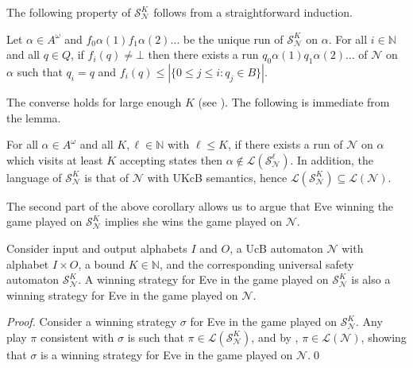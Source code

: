\documentclass[runningheads,a4paper,draft]{llncs}
\newcommand{\eve}{Eve\xspace}
\newcommand{\calN}{\mathcal{N}}
\newcommand{\calS}{\mathcal{S}}
\newcommand{\lang}[1]{\mathcal{L}({#1})}
\begin{document}
The following property of $\calS^K_\calN$ follows from a straightforward
induction.
\begin{lemma}\label{lem:runs-visits}
  Let $\alpha \in A^\omega$ and $f_0 \alpha(1) f_1 \alpha(2) \dots$ be the
  unique run of $\calS^K_\calN$ on $\alpha$. For all $i \in \mathbb{N}$ and
  all $q \in Q$, if $f_i(q) \neq \bot$ then there exists a run $q_0
  \alpha(1) q_1 \alpha(2) \dots$ of $\calN$ on $\alpha$ such that $q_i = q$
  and $f_i(q) \leq |\{0 \leq j \leq i : q_j \in B\}|$.
\end{lemma}
%
The converse holds for large enough $K$ (see ).
The following is immediate from the lemma.
%
\begin{corollary}\label{cor:safe-approx}
  For all $\alpha \in A^\omega$ and all $K,\ell \in \mathbb{N}$ with $\ell
  \leq K$, if there exists a run of $\calN$ on $\alpha$ which visits 
  at least $K$ accepting states then $\alpha \not\in \lang{\calS^\ell_\calN}$.
  In addition, the
  language of \(\calS^K_\calN\) is that of \(\calN\) with UKcB semantics,
  hence \(\lang{\calS^K_\calN} \subseteq \lang{\calN}\).
\end{corollary}

The second part of the above corollary allows us to argue that \eve winning
the game played on $\calS^K_\calN$ implies she wins the game played on
$\calN$.
\begin{lemma}
    Consider input and output alphabets $I$ and $O$, a UcB
    automaton $\calN$ with alphabet $I \times O$, a bound $K \in \mathbb{N}$,
    and the corresponding universal safety automaton $\calS^K_\calN$. A
    winning strategy for \eve in the game played on $\calS^K_\calN$
    is also a winning strategy for \eve in the game played on
    $\calN$.
\end{lemma}
\begin{proof}
  Consider a winning strategy \(\sigma\) for \eve in the game played on
  \(\calS^K_\calN\).  Any play \(\pi\) consistent with \(\sigma\) is such that
  \(\pi \in \lang{\calS^K_\calN}\), and by ,
  \(\pi \in \lang{\calN}\), showing that \(\sigma\) is a winning strategy for
  \eve in the game played on \(\calN\).\qed
\end{proof}
\end{document}
